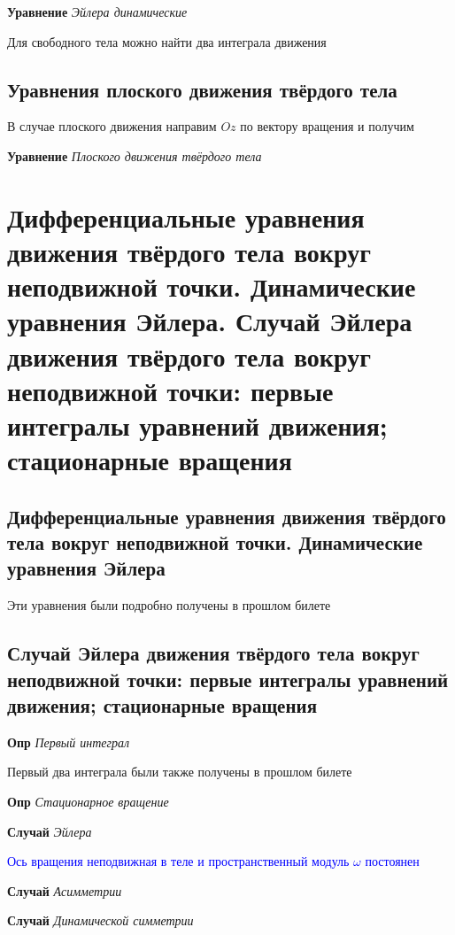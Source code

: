 \documentclass[a4paper, 14pt]{article}
\begin{document}
    \textbf{Уравнение} \textit{Эйлера динамические}
    
    Для свободного тела можно найти два интеграла движения
    
    \subsection{Уравнения плоского движения твёрдого тела}
    
    В случае плоского движения направим $Oz$ по вектору вращения и получим
    
    \textbf{Уравнение} \textit{Плоского движения твёрдого тела}
    
    \section{Дифференциальные уравнения движения твёрдого тела вокруг неподвижной точки. Динамические уравнения Эйлера.
    Случай Эйлера движения твёрдого тела вокруг неподвижной точки: первые интегралы уравнений движения; стационарные
    вращения}
    
    \subsection{Дифференциальные уравнения движения твёрдого тела вокруг неподвижной точки. Динамические уравнения
    Эйлера}
    
    Эти уравнения были подробно получены в прошлом билете
    
    \subsection{Случай Эйлера движения твёрдого тела вокруг неподвижной точки: первые интегралы уравнений движения;
    стационарные вращения}
    
    \textbf{Опр} \textit{Первый интеграл}
    
    Первый два интеграла были также получены в прошлом билете
    
    \textbf{Опр} \textit{Стационарное вращение}
    
    \textbf{Случай} \textit{Эйлера}
    
    \textcolor{blue}{Ось вращения неподвижная в теле и пространственный модуль $\omega$ постоянен}
    
    \textbf{Случай} \textit{Асимметрии}
    
    \textbf{Случай} \textit{Динамической симметрии}
    
\end{document}
